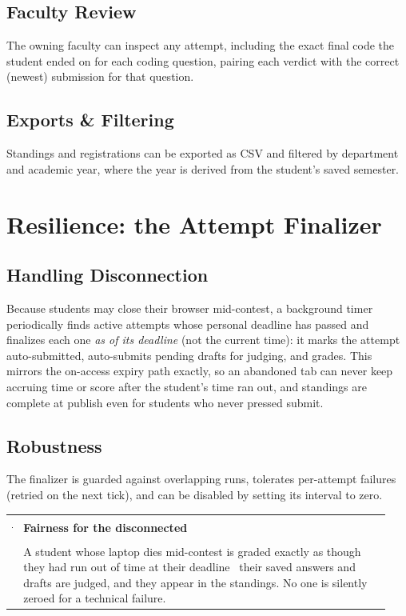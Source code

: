 \documentclass[12pt,a4paper,oneside]{report}
\makeatletter
\newenvironment{callout}[1]{\par\vspace{4pt}\noindent
  \begin{tabular}{@{}p{0.014\linewidth}@{\hspace{0.6em}}p{0.93\linewidth}@{}}
  \textcolor{boxframe}{\rule{2pt}{\baselineskip}} & \textbf{\textcolor{tcetblue}{#1}}\\[2pt] & }{\end{tabular}\par\vspace{6pt}}
\makeatother
\begin{document}
\section{Faculty Review}
The owning faculty can inspect any attempt, including the exact final code the
student ended on for each coding question, pairing each verdict with the correct
(newest) submission for that question.

\section{Exports \& Filtering}
Standings and registrations can be exported as CSV and filtered by department and
academic year, where the year is derived from the student's saved semester.

\chapter{Resilience: the Attempt Finalizer}
\section{Handling Disconnection}
Because students may close their browser mid-contest, a background timer
periodically finds active attempts whose personal deadline has passed and
finalizes each one \emph{as of its deadline} (not the current time): it marks the
attempt auto-submitted, auto-submits pending drafts for judging, and grades. This
mirrors the on-access expiry path exactly, so an abandoned tab can never keep
accruing time or score after the student's time ran out, and standings are
complete at publish even for students who never pressed submit.

\section{Robustness}
The finalizer is guarded against overlapping runs, tolerates per-attempt failures
(retried on the next tick), and can be disabled by setting its interval to zero.

\begin{callout}{Fairness for the disconnected}
A student whose laptop dies mid-contest is graded exactly as though they had run
out of time at their deadline \textemdash\ their saved answers and drafts are
judged, and they appear in the standings. No one is silently zeroed for a
technical failure.
\end{callout}
\end{document}

